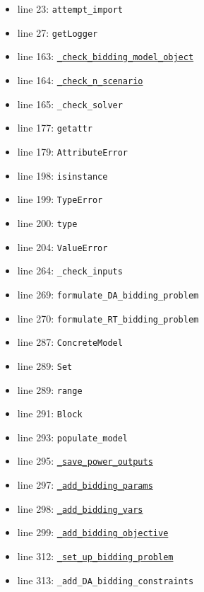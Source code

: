 \documentclass[11pt]{report}
\begin{document}
\begin{itemize}[leftmargin=*]
  \item line 23: \texttt{attempt\_import}
  \item line 27: \texttt{getLogger}
  \item line 163: \hyperref[def:bidder.py:AbstractBidder._check_bidding_model_object:L167]{\texttt{\_check\_bidding\_model\_object}}
  \item line 164: \hyperref[def:bidder.py:AbstractBidder._check_n_scenario:L192]{\texttt{\_check\_n\_scenario}}
  \item line 165: \texttt{\_check\_solver}
  \item line 177: \texttt{getattr}
  \item line 179: \texttt{AttributeError}
  \item line 198: \texttt{isinstance}
  \item line 199: \texttt{TypeError}
  \item line 200: \texttt{type}
  \item line 204: \texttt{ValueError}
  \item line 264: \texttt{\_check\_inputs}
  \item line 269: \texttt{formulate\_DA\_bidding\_problem}
  \item line 270: \texttt{formulate\_RT\_bidding\_problem}
  \item line 287: \texttt{ConcreteModel}
  \item line 289: \texttt{Set}
  \item line 289: \texttt{range}
  \item line 291: \texttt{Block}
  \item line 293: \texttt{populate\_model}
  \item line 295: \hyperref[def:bidder.py:StochasticProgramBidder._save_power_outputs:L339]{\texttt{\_save\_power\_outputs}}
  \item line 297: \hyperref[def:bidder.py:StochasticProgramBidder._add_bidding_params:L360]{\texttt{\_add\_bidding\_params}}
  \item line 298: \hyperref[def:bidder.py:StochasticProgramBidder._add_bidding_vars:L385]{\texttt{\_add\_bidding\_vars}}
  \item line 299: \hyperref[def:bidder.py:StochasticProgramBidder._add_bidding_objective:L418]{\texttt{\_add\_bidding\_objective}}
  \item line 312: \hyperref[def:bidder.py:StochasticProgramBidder._set_up_bidding_problem:L275]{\texttt{\_set\_up\_bidding\_problem}}
  \item line 313: \texttt{\_add\_DA\_bidding\_constraints}

\end{itemize}
\end{document}
